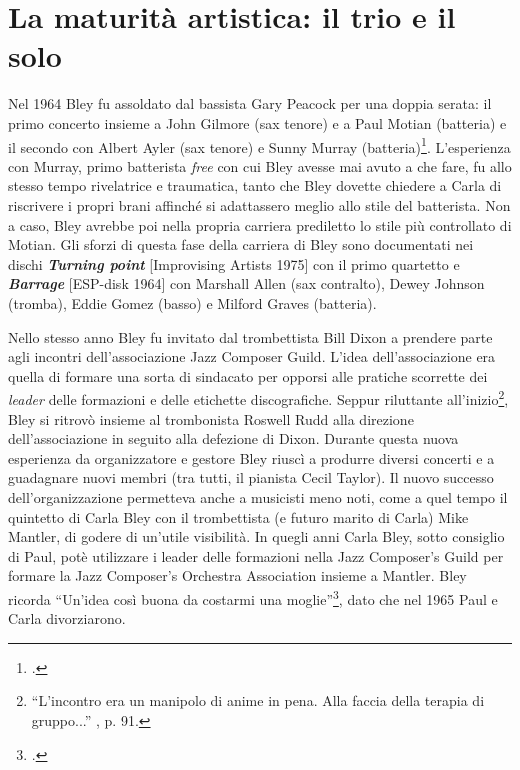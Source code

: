 \section{La maturità artistica: il trio e il solo}
Nel 1964 Bley fu assoldato dal bassista Gary Peacock per una doppia serata: il primo concerto insieme a John Gilmore (sax tenore) e a Paul Motian (batteria) e il secondo con Albert Ayler (sax tenore) e Sunny Murray (batteria)\footcite[89]{stopping}. L'esperienza con Murray, primo batterista \textit{free} con cui Bley avesse mai avuto a che fare, fu allo stesso tempo rivelatrice e traumatica, tanto che Bley dovette chiedere a Carla di riscrivere i propri brani affinché si adattassero meglio allo stile del batterista. Non a caso, Bley avrebbe poi nella propria carriera prediletto lo stile più controllato di Motian. Gli sforzi di questa fase della carriera di Bley sono documentati nei dischi \textit{\textbf{Turning point}} [Improvising Artists 1975] con il primo quartetto e \textit{\textbf{Barrage}} [ESP-disk 1964] con Marshall Allen (sax contralto), Dewey Johnson (tromba), Eddie Gomez (basso) e Milford Graves (batteria).\par
Nello stesso anno Bley fu invitato dal trombettista Bill Dixon a prendere parte agli incontri dell'associazione Jazz Composer Guild. L'idea dell'associazione era quella di formare una sorta di sindacato per opporsi alle pratiche scorrette dei \textit{leader} delle formazioni e delle etichette discografiche. Seppur riluttante all'inizio\footnote{``L'incontro era un manipolo di anime in pena. Alla faccia della terapia di gruppo...'' \cite{stopping}, p. 91.}, Bley si ritrovò insieme al trombonista Roswell Rudd alla direzione dell'associazione in seguito alla defezione di Dixon. Durante questa nuova esperienza da organizzatore e gestore Bley riuscì a produrre diversi concerti e a guadagnare nuovi membri (tra tutti, il pianista Cecil Taylor). Il nuovo successo dell'organizzazione permetteva anche a musicisti meno noti, come a quel tempo il quintetto di Carla Bley con il trombettista (e futuro marito di Carla) Mike Mantler, di godere di un'utile visibilità. In quegli anni Carla Bley, sotto consiglio di Paul, potè utilizzare i leader delle formazioni nella Jazz Composer's Guild per formare la Jazz Composer's Orchestra Association insieme a Mantler. Bley ricorda ``Un'idea così buona da costarmi una moglie''\footcite[95]{stopping}, dato che nel 1965 Paul e Carla divorziarono.\par
